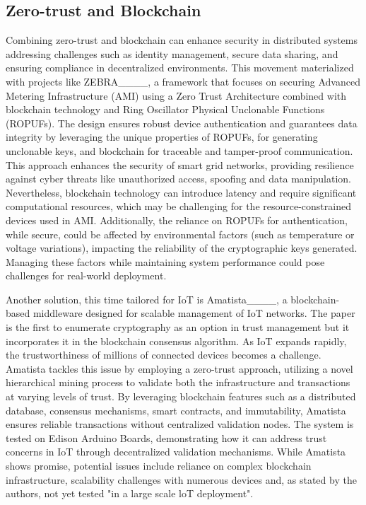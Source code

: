 \subsection{Zero-trust and Blockchain}
Combining zero-trust and blockchain can enhance security in distributed systems addressing challenges such as identity management, secure data sharing, and ensuring compliance in decentralized environments. This movement materialized with projects like ZEBRA____, a framework that focuses on securing Advanced Metering Infrastructure (AMI) using a Zero Trust Architecture combined with blockchain technology and Ring Oscillator Physical Unclonable Functions (ROPUFs). The design ensures robust device authentication and guarantees data integrity by leveraging the unique properties of ROPUFs, for generating unclonable keys, and blockchain for traceable and tamper-proof communication. This approach enhances the security of smart grid networks, providing resilience against cyber threats like unauthorized access, spoofing and data manipulation. Nevertheless, blockchain technology can introduce latency and require significant computational resources, which may be challenging for the resource-constrained devices used in AMI. Additionally, the reliance on ROPUFs for authentication, while secure, could be affected by environmental factors (such as temperature or voltage variations), impacting the reliability of the cryptographic keys generated. Managing these factors while maintaining system performance could pose challenges for real-world deployment.

Another solution, this time tailored for IoT is Amatista____, a blockchain-based middleware designed for scalable management of IoT networks. The paper is the first to enumerate cryptography as an option in trust management but it incorporates it in the blockchain consensus algorithm. As IoT expands rapidly, the trustworthiness of millions of connected devices becomes a challenge. Amatista tackles this issue by employing a zero-trust approach, utilizing a novel hierarchical mining process to validate both the infrastructure and transactions at varying levels of trust. By leveraging blockchain features such as a distributed database, consensus mechanisms, smart contracts, and immutability, Amatista ensures reliable transactions without centralized validation nodes. The system is tested on Edison Arduino Boards, demonstrating how it can address trust concerns in IoT through decentralized validation mechanisms. While Amatista shows promise, potential issues include reliance on complex blockchain infrastructure, scalability challenges with numerous devices and, as stated by the authors, not yet tested "in a large scale loT deployment".
